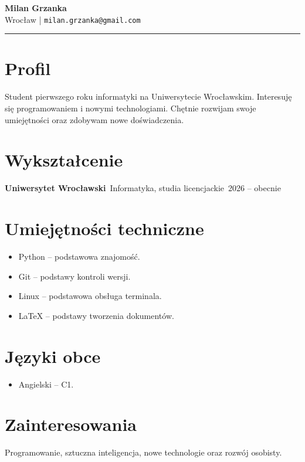 \documentclass[a4paper,10pt]{article}
\begin{document}
\begin{center}
{\LARGE \textbf{Milan Grzanka}}\\[5pt]
Wrocław \quad | \quad \texttt{milan.grzanka@gmail.com}
\end{center}

\vspace{5pt}
\hrule
\vspace{10pt}

\section*{Profil}
Student pierwszego roku informatyki na Uniwersytecie
Wrocławskim. Interesuję się programowaniem i nowymi
technologiami. Chętnie rozwijam swoje umiejętności
oraz zdobywam nowe doświadczenia.

\section*{Wykształcenie}
\textbf{Uniwersytet Wrocławski}\
Informatyka, studia licencjackie\
2026 -- obecnie

\section*{Umiejętności techniczne}
\begin{itemize}
\item Python -- podstawowa znajomość.
\item Git -- podstawy kontroli wersji.
\item Linux -- podstawowa obsługa terminala.
\item LaTeX -- podstawy tworzenia dokumentów.
\end{itemize}

\section*{Języki obce}
\begin{itemize}
\item Angielski -- C1.
\end{itemize}

\section*{Zainteresowania}
Programowanie, sztuczna inteligencja, nowe technologie
oraz rozwój osobisty.
\end{document}
